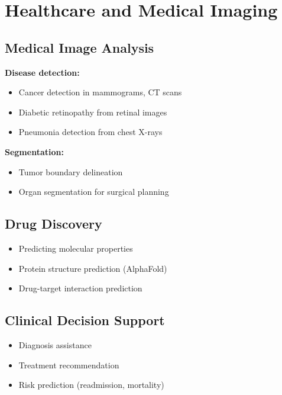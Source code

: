
\section{Healthcare and Medical Imaging}
\label{sec:healthcare-applications}

\subsection{Medical Image Analysis}

\textbf{Disease detection:}
\begin{itemize}
    \item Cancer detection in mammograms, CT scans
    \item Diabetic retinopathy from retinal images
    \item Pneumonia detection from chest X-rays
\end{itemize}

\textbf{Segmentation:}
\begin{itemize}
    \item Tumor boundary delineation
    \item Organ segmentation for surgical planning
\end{itemize}

\subsection{Drug Discovery}

\begin{itemize}
    \item Predicting molecular properties
    \item Protein structure prediction (AlphaFold)
    \item Drug-target interaction prediction
\end{itemize}

\subsection{Clinical Decision Support}

\begin{itemize}
    \item Diagnosis assistance
    \item Treatment recommendation
    \item Risk prediction (readmission, mortality)
\end{itemize}

